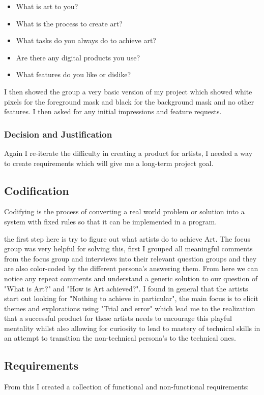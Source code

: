 \documentclass[a4paper]{report}
\begin{document}
\begin{itemize}
\item What is art to you?
\item What is the process to create art?
\item What tasks do you always do to achieve art?
\item Are there any digital products you use?
\item What features do you like or dislike?
\end{itemize}

I then showed the group a very basic version of my project which showed white pixels for the foreground mask and black for the background mask and no other features. I then asked for any initial impressions and feature requests.

\subsubsection{Decision and Justification}
Again I re-iterate the difficulty in creating a product for artists, I needed a way to create requirements which will give me a long-term project goal.

\subsection{Codification}
Codifying is the process of converting a real world problem or solution into a system with fixed rules so that it can be implemented in a program. 

the first step here is try to figure out what artists do to achieve Art. The focus group was very helpful for solving this, first I grouped all meaningful comments from the focus group and interviews into their relevant question groups and they are also color-coded by the different persona's answering them. From here we can notice any repeat comments and understand a generic solution to our question of "What is Art?" and "How is Art achieved?". I found in general that the artists start out looking for "Nothing to achieve in particular", the main focus is to elicit themes and explorations using "Trial and error" which lead me to the realization that a successful product for these artists needs to encourage this playful mentality whilst also allowing for curiosity to lead to mastery of technical skills in an attempt to transition the non-technical persona's to the technical ones. 

\subsection{Requirements}
From this I created a collection of functional and non-functional requirements:
\end{document}
